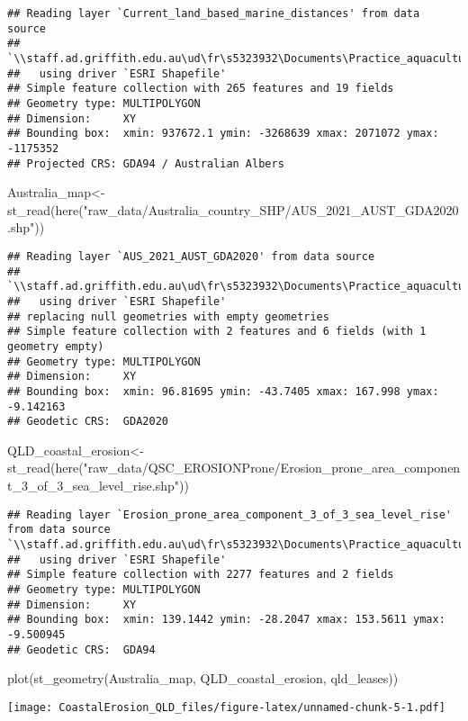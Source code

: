 \documentclass[
]{article}
\newenvironment{Shaded}{\begin{snugshade}}{\end{snugshade}}
\newcommand{\FunctionTok}[1]{\textcolor[rgb]{0.00,0.00,0.00}{#1}}
\newcommand{\NormalTok}[1]{#1}
\newcommand{\OtherTok}[1]{\textcolor[rgb]{0.56,0.35,0.01}{#1}}
\newcommand{\StringTok}[1]{\textcolor[rgb]{0.31,0.60,0.02}{#1}}
\begin{document}
\begin{verbatim}
## Reading layer `Current_land_based_marine_distances' from data source 
##   `\\staff.ad.griffith.edu.au\ud\fr\s5323932\Documents\Practice_aquaculture\raw_data\QLD_aqua\Current_land_based_marine_distances.shp' 
##   using driver `ESRI Shapefile'
## Simple feature collection with 265 features and 19 fields
## Geometry type: MULTIPOLYGON
## Dimension:     XY
## Bounding box:  xmin: 937672.1 ymin: -3268639 xmax: 2071072 ymax: -1175352
## Projected CRS: GDA94 / Australian Albers
\end{verbatim}

\begin{Shaded}
\begin{Highlighting}[]
\NormalTok{Australia\_map}\OtherTok{\textless{}{-}}\FunctionTok{st\_read}\NormalTok{(}\FunctionTok{here}\NormalTok{(}\StringTok{"raw\_data/Australia\_country\_SHP/AUS\_2021\_AUST\_GDA2020.shp"}\NormalTok{))}
\end{Highlighting}
\end{Shaded}

\begin{verbatim}
## Reading layer `AUS_2021_AUST_GDA2020' from data source 
##   `\\staff.ad.griffith.edu.au\ud\fr\s5323932\Documents\Practice_aquaculture\raw_data\Australia_country_SHP\AUS_2021_AUST_GDA2020.shp' 
##   using driver `ESRI Shapefile'
## replacing null geometries with empty geometries
## Simple feature collection with 2 features and 6 fields (with 1 geometry empty)
## Geometry type: MULTIPOLYGON
## Dimension:     XY
## Bounding box:  xmin: 96.81695 ymin: -43.7405 xmax: 167.998 ymax: -9.142163
## Geodetic CRS:  GDA2020
\end{verbatim}

\begin{Shaded}
\begin{Highlighting}[]
\NormalTok{QLD\_coastal\_erosion}\OtherTok{\textless{}{-}}\FunctionTok{st\_read}\NormalTok{(}\FunctionTok{here}\NormalTok{(}\StringTok{"raw\_data/QSC\_EROSIONProne/Erosion\_prone\_area\_component\_3\_of\_3\_sea\_level\_rise.shp"}\NormalTok{))}
\end{Highlighting}
\end{Shaded}

\begin{verbatim}
## Reading layer `Erosion_prone_area_component_3_of_3_sea_level_rise' from data source `\\staff.ad.griffith.edu.au\ud\fr\s5323932\Documents\Practice_aquaculture\raw_data\QSC_EROSIONProne\Erosion_prone_area_component_3_of_3_sea_level_rise.shp' 
##   using driver `ESRI Shapefile'
## Simple feature collection with 2277 features and 2 fields
## Geometry type: MULTIPOLYGON
## Dimension:     XY
## Bounding box:  xmin: 139.1442 ymin: -28.2047 xmax: 153.5611 ymax: -9.500945
## Geodetic CRS:  GDA94
\end{verbatim}

\begin{Shaded}
\begin{Highlighting}[]
\FunctionTok{plot}\NormalTok{(}\FunctionTok{st\_geometry}\NormalTok{(Australia\_map, QLD\_coastal\_erosion, qld\_leases))}
\end{Highlighting}
\end{Shaded}

\texttt{[image: CoastalErosion\_QLD\_files/figure-latex/unnamed-chunk-5-1.pdf]}
\end{document}
